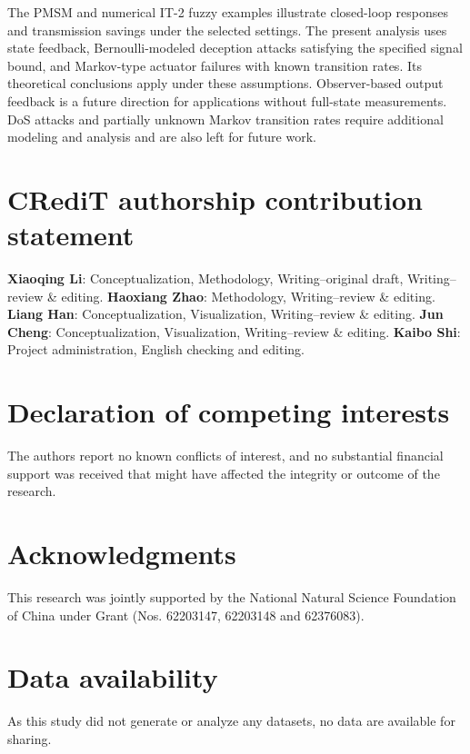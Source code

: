\documentclass[preprint,review,fleqn,sort&compress,3p]{elsarticle}
\theoremstyle{definition} %
\theoremstyle{definition}%
\begin{document}
The PMSM and numerical IT-2 fuzzy examples illustrate closed-loop responses and transmission savings under the selected settings. The present analysis uses state feedback, Bernoulli-modeled deception attacks satisfying the specified signal bound, and Markov-type actuator failures with known transition rates. Its theoretical conclusions apply under these assumptions. Observer-based output feedback is a future direction for applications without full-state measurements. DoS attacks and partially unknown Markov transition rates require additional modeling and analysis and are also left for future work.


\section*{CRediT authorship contribution statement}
{\bf Xiaoqing Li}: Conceptualization, Methodology, Writing--original draft, Writing--review \& editing. %
{\bf Haoxiang Zhao}: Methodology, Writing--review \& editing. 
{\bf Liang Han}: Conceptualization, Visualization, Writing--review \& editing.
{\bf Jun Cheng}: Conceptualization, Visualization, Writing--review \& editing. 
{\bf Kaibo Shi}: Project administration, English checking and editing. 
\section*{Declaration of competing interests}
The authors report no known conflicts of interest, and no substantial financial support was received that might have affected the integrity or outcome of the research.

\section*{Acknowledgments}
This research was jointly supported by the National Natural Science Foundation of China under Grant (Nos. 62203147, 62203148 and 62376083).
\section*{Data availability}
As this study did not generate or analyze any datasets, no data are available for sharing.

 
 
\end{document}
